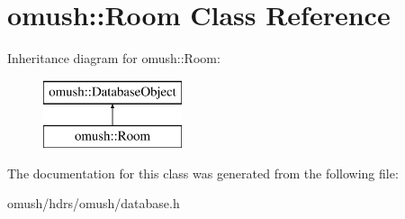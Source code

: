 \hypertarget{classomush_1_1_room}{\section{omush\-:\-:Room Class Reference}
\label{classomush_1_1_room}
}
Inheritance diagram for omush\-:\-:Room\-:\begin{figure}[H]
\begin{center}
\leavevmode
\includegraphics[height=2.000000cm]{classomush_1_1_room}
\end{center}
\end{figure}


The documentation for this class was generated from the following file\-:\begin{DoxyCompactItemize}
\item 
omush/hdrs/omush/database.\-h\end{DoxyCompactItemize}
